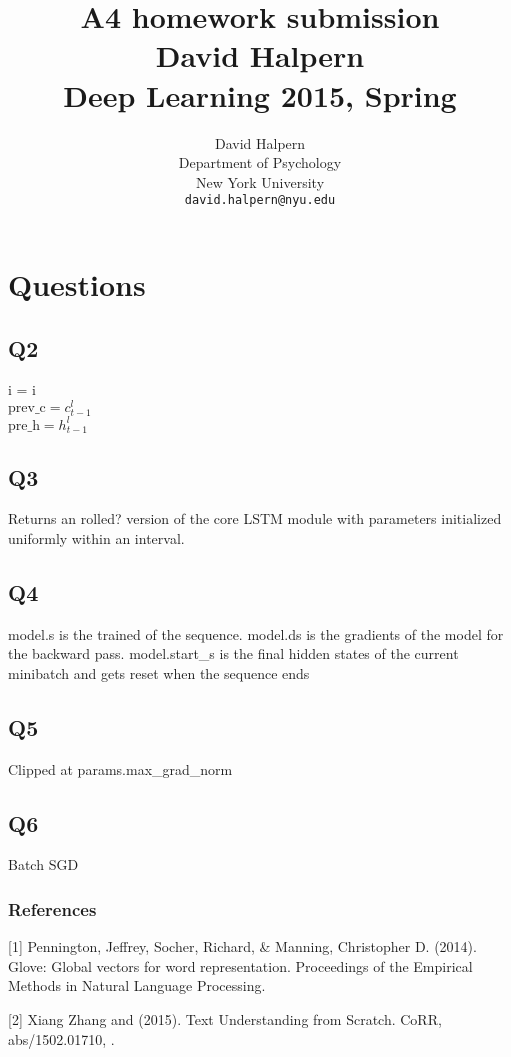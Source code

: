 \documentclass{article} %
\title{A4 homework submission \\ David Halpern \\ Deep Learning 2015, Spring}
\author{
David Halpern\\
Department of Psychology\\
New York University\\
\texttt{david.halpern@nyu.edu} \\
}
\begin{document}
\maketitle


\section{Questions}

\subsection{Q2}

i = i\\
$\text{prev\_c} = c_{t-1}^l$\\
$\text{pre\_h} = h_{t-1}^l$

\subsection{Q3}
Returns an rolled? version of the core LSTM module with parameters initialized uniformly within an interval.

\subsection{Q4}
model.s is the trained of the sequence. model.ds is the gradients of the model for the backward pass. model.start_s is the final hidden states of the current minibatch and gets reset when the sequence ends

\subsection{Q5}
Clipped at params.max_grad_norm

\subsection{Q6}
Batch SGD

\subsubsection*{References}

\small{

[1] Pennington, Jeffrey, Socher, Richard, \& Manning, Christopher D. (2014). Glove: Global vectors for word representation. Proceedings of the Empirical Methods in Natural Language Processing.

[2] Xiang Zhang and (2015). Text Understanding from Scratch. CoRR, abs/1502.01710, .
}
\end{document}
